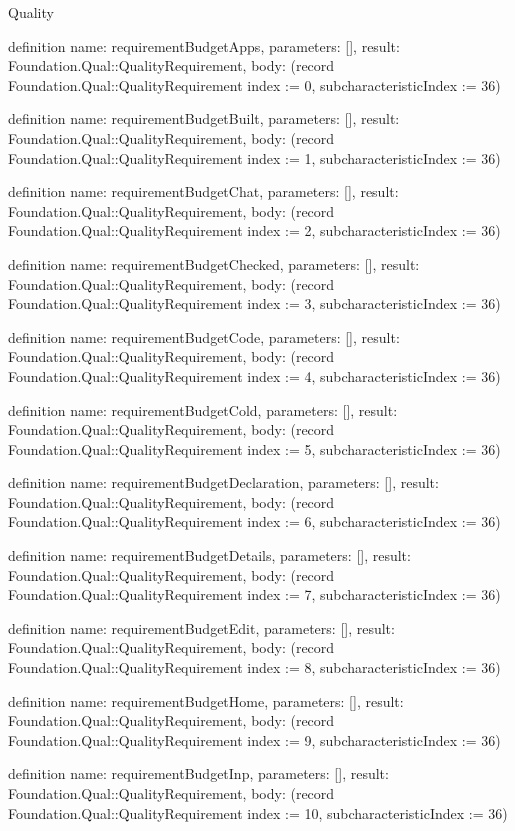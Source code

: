 \begin{lexlean}{Quality}
\begin{semanticmodule}
definition{
  name: requirementBudgetApps,
  parameters: [],
  result: Foundation.Qual::QualityRequirement,
  body: (record Foundation.Qual::QualityRequirement {index := 0, subcharacteristicIndex := 36})
}

definition{
  name: requirementBudgetBuilt,
  parameters: [],
  result: Foundation.Qual::QualityRequirement,
  body: (record Foundation.Qual::QualityRequirement {index := 1, subcharacteristicIndex := 36})
}

definition{
  name: requirementBudgetChat,
  parameters: [],
  result: Foundation.Qual::QualityRequirement,
  body: (record Foundation.Qual::QualityRequirement {index := 2, subcharacteristicIndex := 36})
}

definition{
  name: requirementBudgetChecked,
  parameters: [],
  result: Foundation.Qual::QualityRequirement,
  body: (record Foundation.Qual::QualityRequirement {index := 3, subcharacteristicIndex := 36})
}

definition{
  name: requirementBudgetCode,
  parameters: [],
  result: Foundation.Qual::QualityRequirement,
  body: (record Foundation.Qual::QualityRequirement {index := 4, subcharacteristicIndex := 36})
}

definition{
  name: requirementBudgetCold,
  parameters: [],
  result: Foundation.Qual::QualityRequirement,
  body: (record Foundation.Qual::QualityRequirement {index := 5, subcharacteristicIndex := 36})
}

definition{
  name: requirementBudgetDeclaration,
  parameters: [],
  result: Foundation.Qual::QualityRequirement,
  body: (record Foundation.Qual::QualityRequirement {index := 6, subcharacteristicIndex := 36})
}

definition{
  name: requirementBudgetDetails,
  parameters: [],
  result: Foundation.Qual::QualityRequirement,
  body: (record Foundation.Qual::QualityRequirement {index := 7, subcharacteristicIndex := 36})
}

definition{
  name: requirementBudgetEdit,
  parameters: [],
  result: Foundation.Qual::QualityRequirement,
  body: (record Foundation.Qual::QualityRequirement {index := 8, subcharacteristicIndex := 36})
}

definition{
  name: requirementBudgetHome,
  parameters: [],
  result: Foundation.Qual::QualityRequirement,
  body: (record Foundation.Qual::QualityRequirement {index := 9, subcharacteristicIndex := 36})
}

definition{
  name: requirementBudgetInp,
  parameters: [],
  result: Foundation.Qual::QualityRequirement,
  body: (record Foundation.Qual::QualityRequirement {index := 10, subcharacteristicIndex := 36})
}


\end{semanticmodule}
\end{lexlean}

